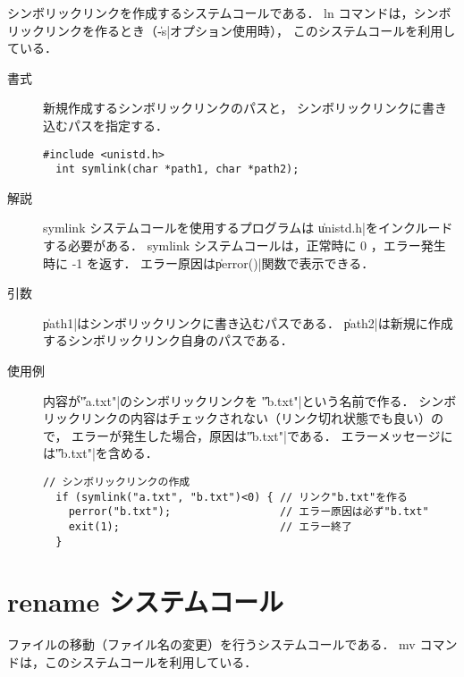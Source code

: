 シンボリックリンクを作成するシステムコールである．
ln コマンドは，シンボリックリンクを作るとき（\|-s|オプション使用時），
このシステムコールを利用している．

\begin{description}
\item[書式] 新規作成するシンボリックリンクのパスと，
シンボリックリンクに書き込むパスを指定する．
\begin{lstlisting}[numbers=none]
  #include <unistd.h>
  int symlink(char *path1, char *path2);
\end{lstlisting}

\item[解説] symlink システムコールを使用するプログラムは
\|unistd.h|をインクルードする必要がある．
symlink システムコールは，正常時に 0 ，エラー発生時に -1 を返す．
エラー原因は\|perror()|関数で表示できる．

\item[引数] \|path1|はシンボリックリンクに書き込むパスである．
\|path2|は新規に作成するシンボリックリンク自身のパスである．

\item[使用例] 内容が\|"a.txt"|のシンボリックリンクを
\|"b.txt"|という名前で作る．
シンボリックリンクの内容はチェックされない（リンク切れ状態でも良い）ので，
エラーが発生した場合，原因は\|"b.txt"|である．
エラーメッセージには\|"b.txt"|を含める．
\begin{lstlisting}[numbers=none]
  // シンボリックリンクの作成
  if (symlink("a.txt", "b.txt")<0) { // リンク"b.txt"を作る
    perror("b.txt");                 // エラー原因は必ず"b.txt"
    exit(1);                         // エラー終了
  }
\end{lstlisting}
\end{description}

\section{rename システムコール}
ファイルの移動（ファイル名の変更）を行うシステムコールである．
mv コマンドは，このシステムコールを利用している．

